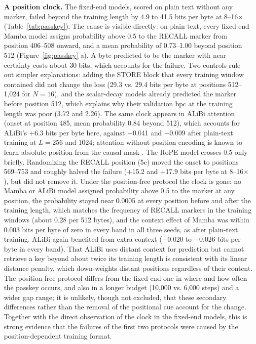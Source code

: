 \documentclass[11pt]{article}
\begin{document}
\textbf{A position clock.} The fixed-end models, scored on plain text without any marker, failed beyond the training length by 4.9 to 41.5 bits per byte at 8--16$\times$ (Table~\ref{tab:passkey}). The cause is visible directly: on plain text, every fixed-end Mamba model assigns probability above 0.5 to the RECALL marker from position 406--508 onward, and a mean probability of 0.73--1.00 beyond position 512 (Figure~\ref{fig:passkey} a). A byte predicted to be the marker with near certainty costs about 30 bits, which accounts for the failure. Two controls rule out simpler explanations: adding the STORE block that every training window contained did not change the loss (29.3 vs. 29.4 bits per byte at positions 512--1,024 for $N = 16$), and the scalar-decay models already predicted the marker before position 512, which explains why their validation bpc at the training length was poor (3.72 and 2.26). The same clock appears in ALiBi attention (onset at position 485, mean probability 0.84 beyond 512), which accounts for ALiBi's +6.3 bits per byte here, against $-$0.041 and $-$0.009 after plain-text training at $L = 256$ and $1024$; attention without position encoding is known to learn absolute position from the causal mask \citep{haviv2022nope}. The RoPE model crosses 0.5 only briefly. Randomizing the RECALL position (5c) moved the onset to positions 569--753 and roughly halved the failure (+15.2 and +17.9 bits per byte at 8--16$\times$), but did not remove it. Under the position-free protocol the clock is gone: no Mamba or ALiBi model assigned probability above 0.5 to the marker at any position, the probability stayed near 0.0005 at every position before and after the training length, which matches the frequency of RECALL markers in the training windows (about 0.28 per 512 bytes), and the context effect of Mamba was within 0.003 bits per byte of zero in every band in all three seeds, as after plain-text training. ALiBi again benefited from extra context ($-$0.020 to $-$0.026 bits per byte in every band). That ALiBi uses distant context for prediction but cannot retrieve a key beyond about twice its training length is consistent with its linear distance penalty, which down-weights distant positions regardless of their content. The position-free protocol differs from the fixed-end one in where and how often the passkey occurs, and also in a longer budget (10,000 vs. 6,000 steps) and a wider gap range; it is unlikely, though not excluded, that these secondary differences rather than the removal of the positional cue account for the change. Together with the direct observation of the clock in the fixed-end models, this is strong evidence that the failures of the first two protocols were caused by the position-dependent training format.
\end{document}
